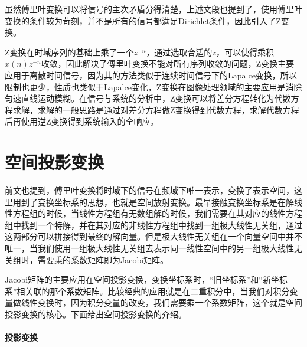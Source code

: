 \documentclass{hitreport}
\begin{document}
虽然傅里叶变换可以将信号的主次矛盾分得清楚，上述文段也提到了，使用傅里叶变换的条件较为苛刻，并不是所有的信号都满足Dirichlet条件，因此引入了Z变换。

Z变换在时域序列的基础上乘了一个$z^{-n}$，通过选取合适的$z$，可以使得乘积$x\left(n\right)z^{-n}$收敛，因此解决了傅里叶变换不能对所有序列收敛的问题，Z变换主要应用于离散时间信号，因为其的方法类似于连续时间信号下的Lapalce变换，所以限制也更少，性质也类似于Lapalce变化，Z变换在图像处理领域的主要应用是消除匀速直线运动模糊。在信号与系统的分析中，Z变换可以将差分方程转化为代数方程求解，求解的一般思路是通过对差分方程做Z变换得到代数方程，求解代数方程后再使用逆Z变换得到系统输入的全响应。


\section{空间投影变换}

前文也提到，傅里叶变换将时域下的信号在频域下唯一表示，变换了表示空间，这里用到了变换坐标系的思想，也就是空间放射变换。最早接触变换坐标系是在解线性方程组的时候，当线性方程组有无数组解的时候，我们需要在其对应的线性方程组中找到一个特解，并在其对应的非线性方程组中找到一组极大线性无关组，通过这两部分可以拼接得到最终的解向量。但是极大线性无关组在一个向量空间中并不唯一，当我们使用一组极大线性无关组去表示同一线性空间中的另一组极大线性无关组时，需要乘的系数矩阵即为Jacobi矩阵。

Jacobi矩阵的主要应用在空间投影变换，变换坐标系时，“旧坐标系”和“新坐标系”相关联的那个系数矩阵。比较经典的应用就是在二重积分中，当我们对积分变量做线性变换时，因为积分变量的改变，我们需要乘一个系数矩阵，这个就是空间投影变换的核心。下面给出空间投影变换的介绍。

\paragraph{投影变换}
\end{document}

